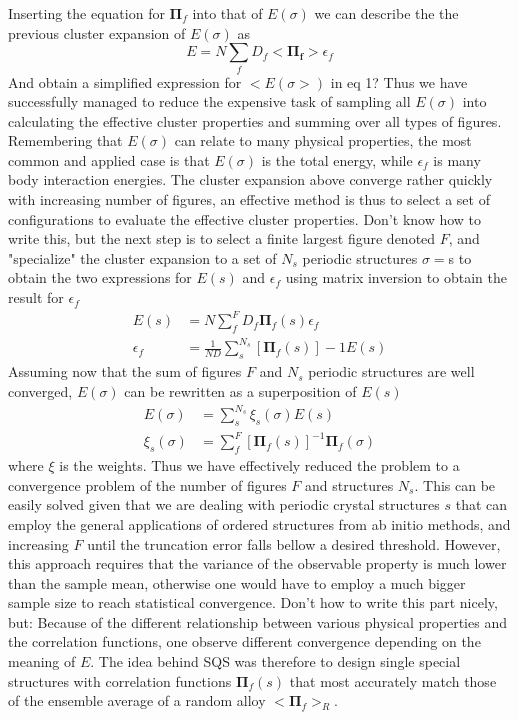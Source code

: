 Inserting the equation for $\boldsymbol{\Pi}_f$ into that of $E(\sigma)$ we can describe the the previous cluster expansion of $E(\sigma)$ as
\begin{equation}
    E = N\sum_f D_f<\boldsymbol{\Pi_f}>\epsilon_f
\end{equation}
And obtain a simplified expression for $<E(\sigma>)$ in eq 1? Thus we have successfully managed to reduce the expensive task of sampling all $E(\sigma)$ into calculating the effective cluster properties and summing over all types of figures. Remembering that $E(\sigma)$ can relate to many physical properties, the most common and applied case is that $E(\sigma)$ is the total energy, while $\epsilon_f$ is many body interaction energies. The cluster expansion above converge rather quickly with increasing number of figures, an effective method is thus to select a set of configurations to evaluate the effective cluster properties. Don't know how to write this, but the next step is to select a finite largest figure denoted $F$, and "specialize" the cluster expansion to a set of $N_s$ periodic structures ${\sigma} = ${s} to obtain the two expressions for $E(s)$ and $\epsilon_f$ using matrix inversion to obtain the result for $\epsilon_f$
\begin{align}
E(s) &= N\sum_{f}^{F} D_f \boldsymbol{\Pi}_f (s)\epsilon_f \\     
\epsilon_f &= \frac{1}{ND}\sum_{s}^{N_s}[\boldsymbol{\Pi}_f (s)]-1E(s)
\end{align}
Assuming now that the sum of figures $F$ and $N_s$ periodic structures are well converged, $E(\sigma)$ can be rewritten as a superposition of $E(s)$
\begin{align}
    E(\sigma) &= \sum_{s}^{N_s}\xi_s(\sigma)E(s) \\
    \xi_s(\sigma) &= \sum_{f}^{F}[\boldsymbol{\Pi}_f(s)]^{-1}\boldsymbol{\Pi}_f(\sigma)    
\end{align}
where $\xi$ is the weights. Thus we have effectively reduced the problem to a convergence problem of the number of figures $F$ and structures $N_s$. This can be easily solved given that we are dealing with periodic crystal structures ${s}$ that can employ the general applications of ordered structures from ab initio methods, and increasing $F$ until the truncation error falls bellow a desired threshold. However, this approach requires that the variance of the observable property is much lower than the sample mean, otherwise one would have to employ a much bigger sample size to reach statistical convergence. Don't how to write this part nicely, but: Because of the different relationship between various physical properties and the correlation functions, one observe different convergence depending on the meaning of $E$. The idea behind SQS was therefore to design single special structures with correlation functions ${\boldsymbol{\Pi}_f(s)}$ that most accurately match those of the ensemble average of a random alloy $<\boldsymbol{\Pi}_f>_R$. 

